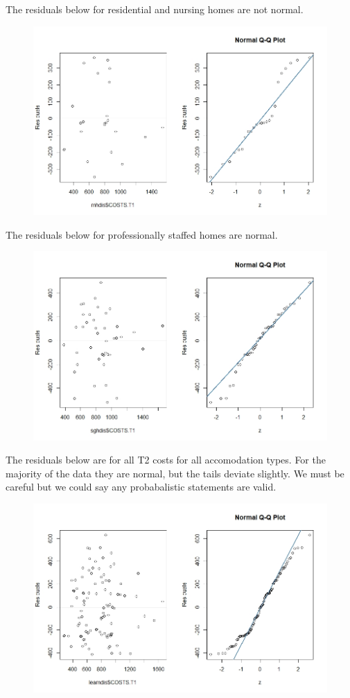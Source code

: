 \documentclass[]{article}
\begin{document}
The residuals below for residential and nursing homes are not normal.
\begin{figure}[H]
\centering
\includegraphics[width=12cm]{RStudio/jpeg/Res_RNH.jpeg}
\end{figure}
The residuals below for professionally staffed homes are normal.
\begin{figure}[H]
\centering
\includegraphics[width=12cm]{RStudio/jpeg/Res_SGH.jpeg}
\end{figure}
\newpage
The residuals below are for all T2 costs for all accomodation types. For the majority of the data they are normal, but the tails deviate slightly. We must be careful but we could say any probabalistic statements are valid.
\begin{figure}[H]
\centering
\includegraphics[width=12cm]{RStudio/jpeg/Res_COST.jpeg}
\end{figure}
\end{document}
